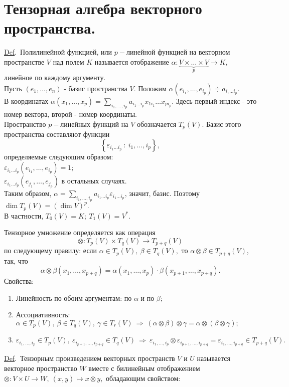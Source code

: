 \documentclass[draft]{article}%
\newcommand{\eps}{\varepsilon}
\newcommand{\de}{\par\noindent\underline{Def}.\ }%
\newcommand{\ab}{\par\noindent}%
\newcommand{\baz}[1]{\left(#1_1,\dots,#1_n\right)}%
\newcommand{\ty}{\otimes}
\begin{document}
\section{Тензорная алгебра векторного пространства.}
\label{q59}
\de Полилинейной функцией, или $p-$линейной функцией на векторном пространстве $V$ над полем $K$ называется
отображение $\alpha:\underbrace{V\times\dots\times V}_p\rightarrow K,$ линейное по каждому аргументу.\\
Пусть $\baz{e}$ - базис пространства $V$. Положим $\alpha(e_{i_1},\dots,e_{i_p})\doteqdot a_{i_1\dots i_p}.$
\\В координатах $\alpha(x_1,\dots,x_p)=\sum\limits_{i_1,\dots,i_p}a_{i_1\dots i_p}x_{1i_1}\dots x_{pi_p}.$ Здесь
первый индекс - это номер вектора, второй - номер координаты.\\
Пространство $p-$линейных функций на $V$ обозначается $T_p(V).$ Базис этого пространства составляют функции
$$
\left\{\eps_{i_1\dots i_p}\ :\ i_1,\dots,i_p\right\},
$$
определяемые следующим образом:
\\
$\eps_{i_1\dots i_p}(e_{i_1},\dots,e_{i_p})=1;$\\
$\eps_{i_1\dots i_p}(e_{j_1},\dots,e_{j_p})$ в остальных случаях.
\\
Таким образом, $\alpha=\sum\limits_{i_1,\dots,i_p}a_{i_1\dots i_p}\eps_{i_1\dots i_p}$, значит, базис. Поэтому
$\dim T_p(V)=(\dim V)^p.$\\ В частности, $T_0(V)=K;\ T_1(V)=V^*.$
\ab Тензорное умножение определяется как операция
$$
\ty:T_p(V)\times T_q(V)\rightarrow T_{p+q}(V)
$$
по следующему правилу: если $\alpha\in T_p(V),\ \beta\in T_q(V),$ то $\alpha\ty\beta\in T_{p+q}(V)$, так, что
$$
\alpha\ty\beta(x_1,\dots,x_{p+q})=\alpha(x_1,\dots,x_p)\cdot\beta(x_{p+1},\dots,x_{p+q}).
$$
Свойства: \begin{enumerate}
    \item Линейность по обоим аргументам: по $\alpha$ и по $\beta$;
    \item Ассоциативность: $\alpha\in T_p(V),\ \beta\in T_q(V),\ \gamma\in T_r(V)\ \Rightarrow\ (\alpha\ty\beta)\ty\gamma=\alpha\ty(\beta\ty\gamma);$
    \item $\eps_{i_1,\dots,i_p}\in T_p(V),\ \eps_{i_{p+1},\dots,i_{p+q}}\in T_q(V)\ \Rightarrow\ \eps_{i_1,\dots,i_p}\ty\eps_{i_{p+1},\dots,i_{p+q}}=\eps_{i_1,\dots,i_{p+q}}\in T_{p+q}(V).$
\end{enumerate}
\de Тензорным произведением векторных пространств $V$ и $U$ называется векторное пространство $W$ вместе с билинейным отображением
$\ty:V\times U\rightarrow W,\ (x,y)\mapsto x\ty y,$ обладающим свойством:
\end{document}
